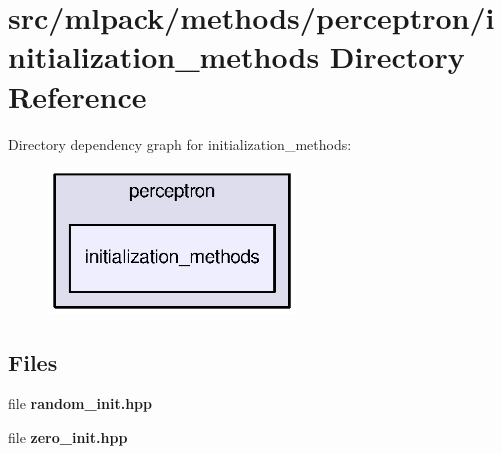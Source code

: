 \section{src/mlpack/methods/perceptron/initialization\+\_\+methods Directory Reference}
\label{dir_99210df2e46ed86bd376cfe0847ba708}
Directory dependency graph for initialization\+\_\+methods\+:
\nopagebreak
\begin{figure}[H]
\begin{center}
\leavevmode
\includegraphics[width=186pt]{dir_99210df2e46ed86bd376cfe0847ba708_dep}
\end{center}
\end{figure}
\subsection*{Files}
\begin{DoxyCompactItemize}
\item 
file {\bf random\+\_\+init.\+hpp}
\item 
file {\bf zero\+\_\+init.\+hpp}
\end{DoxyCompactItemize}
